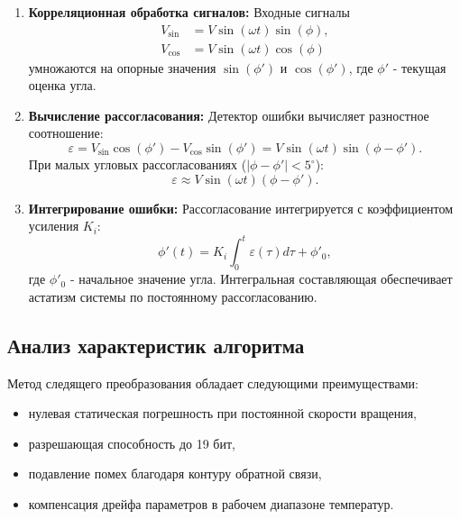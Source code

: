 \begin{enumerate}
    \item \textbf{Корреляционная обработка сигналов:}
    Входные сигналы 
    \begin{align*}
        V_{\sin} &= V \sin(\omega t) \sin(\phi), \\
        V_{\cos} &= V \sin(\omega t) \cos(\phi)
    \end{align*}
    умножаются на опорные значения $\sin(\phi')$ и $\cos(\phi')$, где $\phi'$ - текущая оценка угла.
    
    \item \textbf{Вычисление рассогласования:}
    Детектор ошибки вычисляет разностное соотношение:
    \begin{equation}
        \varepsilon = V_{\sin} \cos(\phi') - V_{\cos} \sin(\phi') = V \sin(\omega t) \sin(\phi - \phi').
        \label{eq:error}
    \end{equation}
    При малых угловых рассогласованиях ($|\phi - \phi'| < 5^\circ$):
    \begin{equation}
        \varepsilon \approx V \sin(\omega t) (\phi - \phi').
        \label{eq:error_approx}
    \end{equation}
    
    \item \textbf{Интегрирование ошибки:}
    Рассогласование интегрируется с коэффициентом усиления $K_i$:
    \begin{equation}
        \phi'(t) = K_i \int_0^t \varepsilon(\tau) d\tau + \phi'_0,
        \label{eq:integration}
    \end{equation}
    где $\phi'_0$ - начальное значение угла. Интегральная составляющая обеспечивает астатизм системы по постоянному рассогласованию.
\end{enumerate}

\subsection{Анализ характеристик алгоритма}
Метод следящего преобразования обладает следующими преимуществами:
\begin{itemize}
    \item нулевая статическая погрешность при постоянной скорости вращения,
    \item разрешающая способность до 19 бит,
    \item подавление помех благодаря контуру обратной связи,
    \item компенсация дрейфа параметров в рабочем диапазоне температур.
\end{itemize}

